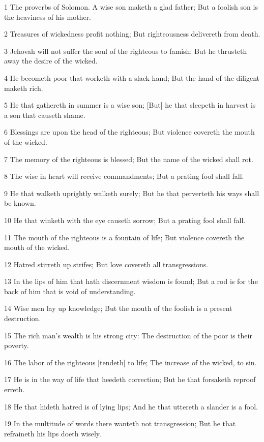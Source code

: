 \par 1 The proverbs of Solomon. A wise son maketh a glad father; But a foolish son is the heaviness of his mother.
\par 2 Treasures of wickedness profit nothing; But righteousness delivereth from death.
\par 3 Jehovah will not suffer the soul of the righteous to famish; But he thrusteth away the desire of the wicked.
\par 4 He becometh poor that worketh with a slack hand; But the hand of the diligent maketh rich.
\par 5 He that gathereth in summer is a wise son; [But] he that sleepeth in harvest is a son that causeth shame.
\par 6 Blessings are upon the head of the righteous; But violence covereth the mouth of the wicked.
\par 7 The memory of the righteous is blessed; But the name of the wicked shall rot.
\par 8 The wise in heart will receive commandments; But a prating fool shall fall.
\par 9 He that walketh uprightly walketh surely; But he that perverteth his ways shall be known.
\par 10 He that winketh with the eye causeth sorrow; But a prating fool shall fall.
\par 11 The mouth of the righteous is a fountain of life; But violence covereth the mouth of the wicked.
\par 12 Hatred stirreth up strifes; But love covereth all transgressions.
\par 13 In the lips of him that hath discernment wisdom is found; But a rod is for the back of him that is void of understanding.
\par 14 Wise men lay up knowledge; But the mouth of the foolish is a present destruction.
\par 15 The rich man's wealth is his strong city: The destruction of the poor is their poverty.
\par 16 The labor of the righteous [tendeth] to life; The increase of the wicked, to sin.
\par 17 He is in the way of life that heedeth correction; But he that forsaketh reproof erreth.
\par 18 He that hideth hatred is of lying lips; And he that uttereth a slander is a fool.
\par 19 In the multitude of words there wanteth not transgression; But he that refraineth his lips doeth wisely.
